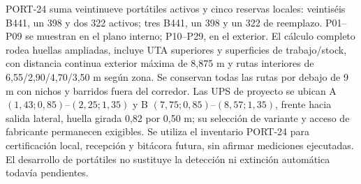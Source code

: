 PORT-24 suma veintinueve portátiles activos y cinco reservas locales: veintiséis B441, un 398 y dos 322 activos; tres B441, un 398 y un 322 de reemplazo. P01--P09 se muestran en el plano interno; P10--P29, en el exterior. El cálculo completo rodea huellas ampliadas, incluye UTA superiores y superficies de trabajo/stock, con distancia continua exterior máxima de 8,875 m y rutas interiores de 6,55/2,90/4,70/3,50 m según zona. Se conservan todas las rutas por debajo de 9 m con nichos y barridos fuera del corredor. Las UPS de proyecto se ubican A $(1,43;0,85)$--$(2,25;1,35)$ y B $(7,75;0,85)$--$(8,57;1,35)$, frente hacia salida lateral, huella girada 0,82 por 0,50 m; su selección de variante y acceso de fabricante permanecen exigibles. Se utiliza el inventario PORT-24 para certificación local, recepción y bitácora futura, sin afirmar mediciones ejecutadas. El desarrollo de portátiles no sustituye la detección ni extinción automática todavía pendientes.
